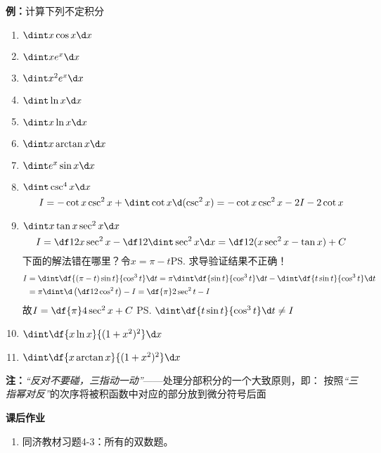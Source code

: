 {\bf 例：}计算下列不定积分
\begin{enumerate}[(1)]
  \setlength{\itemindent}{1cm}
  \item $\dint x\cos x\d x$ 
  \item $\dint xe^x\d x$ 
  \item $\dint x^2e^x\d x$ 
  \item $\dint\ln x\d x$
  \item $\dint x\ln x\d x$ 
  \item $\dint x\arctan x\d x$ 
  \item $\dint e^x\sin x\d x$
  \item $\dint\csc^4x\d x$\\
  $$I=-\cot x\csc^2x+\dint\cot x\d(\csc^2x)=-\cot x\csc^2x-2I-2\cot x$$
  \item $\dint x\tan x\sec^2x\d x$
  $$I=\df12x\sec^2x-\df12\dint\sec^2x\d x=\df12(x\sec^2x-\tan x)+C$$
  下面的解法错在哪里？令$x=\pi-t$\ps{求导验证结果不正确！}{\b
  \begin{align}
  I&=\dint\df{(\pi-t)\sin t}{\cos^3t}\d t=\pi\dint\df{\sin t}{\cos^3t}\d t
  -\dint\df{t\sin t}{\cos^3t}\d t\notag\\
  &=\pi\dint\d\left(\df1{2\cos^2t}\right)-I=\df{\pi}2\sec^2t-I\notag
  \end{align}
  故$I=\df{\pi}4\sec^2x+C$}
  \ps{$\dint\df{t\sin t}{\cos^3t}\d t\ne I$}
  \item $\dint\df{x\ln x}{(1+x^2)^2}\d x$
  \item $\dint\df{x\arctan x}{(1+x^2)^2}\d x$
\end{enumerate}

{\bf 注：}{\b {\it “{反对}不要碰，{三指}动一动”}——处理分部积分的一个大致原则，即：
按照{\it {“三指幂对反”}}的次序将被积函数中对应的部分放到微分符号后面}

\begin{ext}
 	{\bf 课后作业}
	
	\begin{enumerate}
	  \item 同济教材习题4-3：所有的双数题。
	\end{enumerate}
\end{ext}

